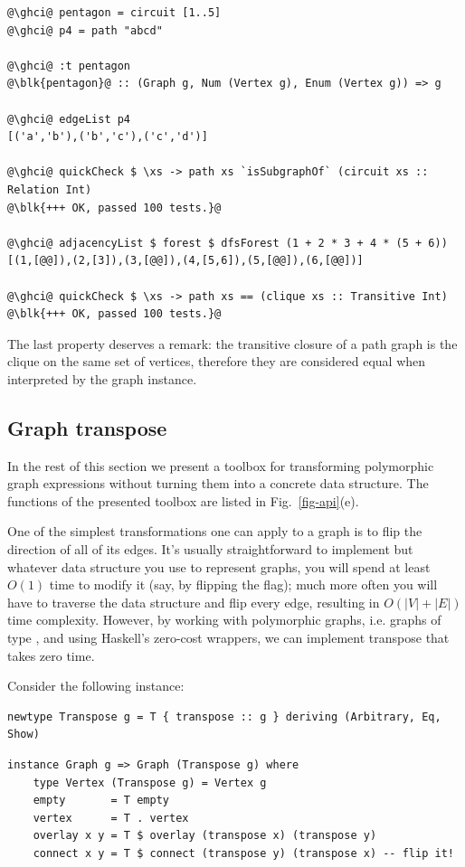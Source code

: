 \begin{verbatim}
@\ghci@ pentagon = circuit [1..5]
@\ghci@ p4 = path "abcd"

@\ghci@ :t pentagon
@\blk{pentagon}@ :: (Graph g, Num (Vertex g), Enum (Vertex g)) => g

@\ghci@ edgeList p4
[('a','b'),('b','c'),('c','d')]

@\ghci@ quickCheck $ \xs -> path xs `isSubgraphOf` (circuit xs :: Relation Int)
@\blk{+++ OK, passed 100 tests.}@

@\ghci@ adjacencyList $ forest $ dfsForest (1 + 2 * 3 + 4 * (5 + 6))
[(1,[@@]),(2,[3]),(3,[@@]),(4,[5,6]),(5,[@@]),(6,[@@])]

@\ghci@ quickCheck $ \xs -> path xs == (clique xs :: Transitive Int)
@\blk{+++ OK, passed 100 tests.}@
\end{verbatim}

The last property deserves a remark: the transitive closure of a path graph
is the clique on the same set of vertices, therefore they are considered equal
when interpreted by the  graph instance.

\subsection{Graph transpose}

In the rest of this section we present a toolbox for transforming polymorphic graph
expressions without turning them into a concrete data structure. The functions of the
presented toolbox are listed in Fig.~\ref{fig-api}(e).

One of the simplest transformations one can apply to a graph is to flip the
direction of all of its edges. It's usually straightforward to implement but
whatever data structure you use to represent graphs, you will spend at least
$O(1)$ time to modify it (say, by flipping the  flag);
much more often you will have to traverse the data structure and flip every edge,
resulting in $O(|V|+|E|)$ time complexity. However, by working with polymorphic
graphs, i.e. graphs of type , and using Haskell's
zero-cost  wrappers, we can implement transpose that takes zero time.

Consider the following  instance:

\begin{verbatim}
newtype Transpose g = T { transpose :: g } deriving (Arbitrary, Eq, Show)
\end{verbatim}
\vspace{1mm}
\begin{verbatim}
instance Graph g => Graph (Transpose g) where
    type Vertex (Transpose g) = Vertex g
    empty       = T empty
    vertex      = T . vertex
    overlay x y = T $ overlay (transpose x) (transpose y)
    connect x y = T $ connect (transpose y) (transpose x) -- flip it!
\end{verbatim}

